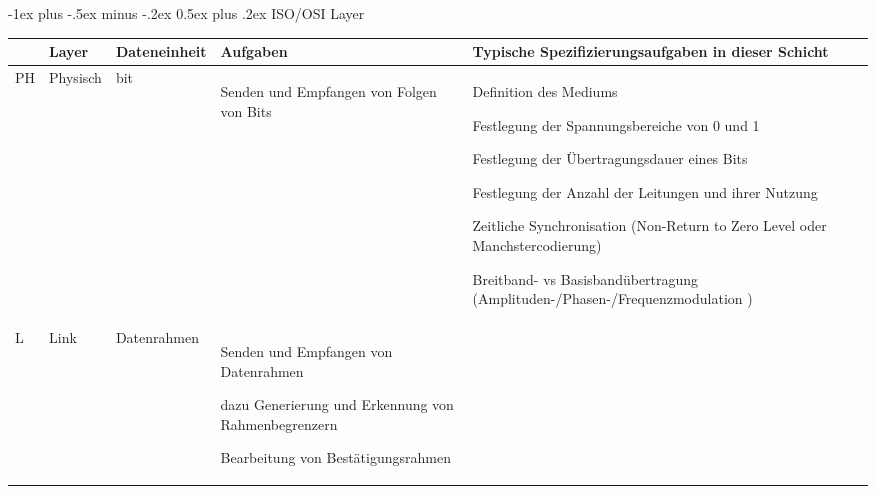 \documentclass[a4paper]{article}
\makeatletter
\renewcommand{\section}{\@startsection{section}{1}{0mm}%
                                {-1ex plus -.5ex minus -.2ex}%
                                {0.5ex plus .2ex}%
                                {\normalfont\large\bfseries}}
\makeatother
\begin{document}
\section{ISO/OSI Layer}
\begin{tabular}{ l | l | l | p{6cm} | p{10cm} }
       & \textbf{Layer} & \textbf{Dateneinheit}                  & \textbf{Aufgaben}                                 & \textbf{Typische Spezifizierungsaufgaben in dieser Schicht} \\\hline
    PH & Physisch       & bit                                    & \begin{itemize*}
        \item Senden und Empfangen von Folgen von Bits 
    \end{itemize*}                    & \begin{itemize*}
        \item Definition des Mediums
        \item Festlegung der Spannungsbereiche von 0 und 1
        \item Festlegung der Übertragungsdauer eines Bits
        \item Festlegung der Anzahl der Leitungen und ihrer Nutzung
        \item Zeitliche Synchronisation (Non-Return to Zero Level oder Manchstercodierung)
        \item Breitband- vs Basisbandübertragung (Amplituden-/Phasen-/Frequenzmodulation ) %
    \end{itemize*}                             \\\hline
    L  & Link           & Datenrahmen                            & \begin{itemize*}
        \item Senden und Empfangen von Datenrahmen
        \item dazu Generierung und Erkennung von Rahmenbegrenzern
        \item Bearbeitung von Bestätigungsrahmen

\end{itemize*}
\end{tabular}
\end{document}
